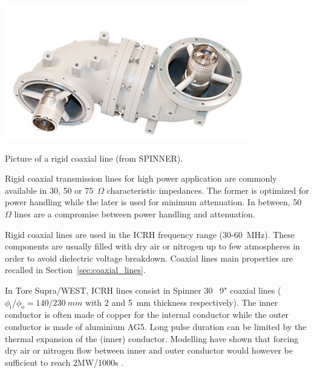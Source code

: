 \begin{marginfigure}
	\centering
	\includegraphics[width=1.0\linewidth]{figures/chap1/SPINNER_Rigid_Line}
	\caption{Picture of a rigid coaxial line (from SPINNER).}
	\label{fig:spinnerrigidline}
\end{marginfigure}

Rigid coaxial transmission lines for high power application are commonly available in 30, 50 or 75~$\si{\Omega}$ characteristic impedances. The former is optimized for power handling while the later is used for minimum attenuation. In between, 50~$\si{\Omega}$ lines are a compromise between power handling and attenuation. 

Rigid coaxial lines are used in the ICRH frequency range (30-60~\si{MHz}). These components are usually filled with dry air or nitrogen up to few atmospheres in order to avoid dielectric voltage breakdown. Coaxial lines main properties are recalled in Section~\ref{sec:coaxial_lines}.

In Tore Supra/WEST, ICRH lines consist in Spinner 30~\si{\Omega} 9" coaxial lines ($\phi_\mathrm{i}/\phi_\mathrm{o}=140/230~\si{mm}$ with 2 and 5~\si{mm} thickness respectively). The inner conductor is often made of copper for the internal conductor while the outer conductor is made of aluminium AG5. Long pulse duration can be limited by the thermal expansion of the (inner) conductor. Modelling have shown that forcing dry air or nitrogen flow between inner and outer conductor would however be sufficient to reach 2\si{MW}/1000\si{s} .


